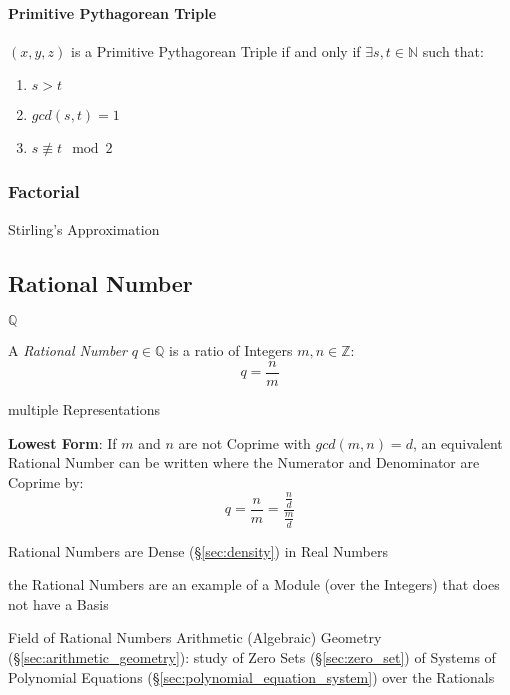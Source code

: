 \paragraph{Primitive Pythagorean Triple}\label{sec:primitive_pythagorean}\hfill

$(x,y,z)$ is a Primitive Pythagorean Triple if and only if $\exists
s,t \in \mathbb{N}$ such that:
\begin{enumerate}
  \item $s > t$
  \item $gcd (s,t) = 1$
  \item $s \not\equiv t \mod 2$
\end{enumerate}



\subsubsection{Factorial}\label{sec:factorial}

Stirling's Approximation



\subsection{Rational Number}\label{sec:rational}

$\mathbb{Q}$

A \emph{Rational Number} $q \in \mathbb{Q}$ is a ratio of Integers
$m,n \in \mathbb{Z}$:
\[
  q = \frac{n}{m}
\]

multiple Representations

\textbf{Lowest Form}: If $m$ and $n$ are not Coprime with $gcd (m,n) =
d$, an equivalent Rational Number can be written where the Numerator
and Denominator are Coprime by:
\[
  q = \frac{n}{m} = \frac{\frac{n}{d}}{\frac{m}{d}}
\]

Rational Numbers are Dense (\S\ref{sec:density}) in Real Numbers

the Rational Numbers are an example of a Module (over the Integers) that does
not have a Basis

Field of Rational Numbers \fist Arithmetic (Algebraic) Geometry
(\S\ref{sec:arithmetic_geometry}): study of Zero Sets (\S\ref{sec:zero_set}) of
Systems of Polynomial Equations (\S\ref{sec:polynomial_equation_system}) over
the Rationals

